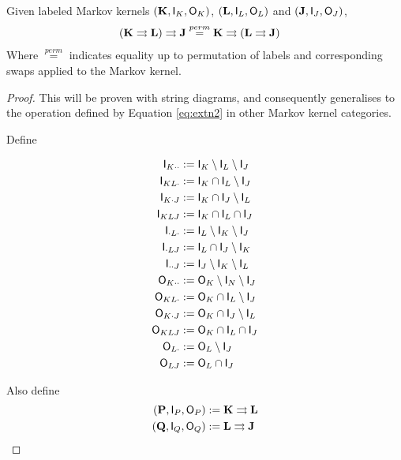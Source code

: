 \begin{lemma}
Given labeled Markov kernels $(\mathbf{K},\mathsf{I}_K,\mathsf{O}_K)$, $(\mathbf{L},\mathsf{I}_L,\mathsf{O}_L)$ and $(\mathbf{J},\mathsf{I}_J,\mathsf{O}_J)$,
\begin{align}
	(\mathbf{K}\rightrightarrows \mathbf{L})\rightrightarrows \mathbf{J} &\overset{perm}{=} \mathbf{K}\rightrightarrows (\mathbf{L}\rightrightarrows \mathbf{J})
\end{align}
Where $\overset{perm}{=}$ indicates equality up to permutation of labels and corresponding swaps applied to the Markov kernel.
\end{lemma}

\begin{proof}
This will be proven with string diagrams, and consequently generalises to the operation defined by Equation \ref{eq:extn2} in other Markov kernel categories.

Define

\begin{align}
	\mathsf{I}_{K\cdot\cdot}&:=\mathsf{I}_K\setminus\mathsf{I}_L\setminus\mathsf{I}_J\\
	\mathsf{I}_{KL\cdot}&:=\mathsf{I}_K\cap\mathsf{I}_L\setminus\mathsf{I}_J\\
	\mathsf{I}_{K\cdot J}&:=\mathsf{I}_K\cap\mathsf{I}_J\setminus\mathsf{I}_L\\
	\mathsf{I}_{KL J}&:=\mathsf{I}_K\cap \mathsf{I}_L\cap\mathsf{I}_J\\
	\mathsf{I}_{\cdot L \cdot} &:= \mathsf{I}_L\setminus\mathsf{I}_K\setminus \mathsf{I}_J\\
	\mathsf{I}_{\cdot L J} &:= \mathsf{I}_L\cap \mathsf{I}_J\setminus \mathsf{I}_K\\
	\mathsf{I}_{\cdot\cdot J} &:= \mathsf{I}_J\setminus\mathsf{I}_K\setminus\mathsf{I}_L\\
	\mathsf{O}_{K\cdot\cdot} &:= \mathsf{O}_K\setminus\mathsf{I}_N\setminus\mathsf{I}_J\\
	\mathsf{O}_{KL\cdot} &:= \mathsf{O}_K\cap\mathsf{I}_L\setminus\mathsf{I}_J\\
	\mathsf{O}_{K\cdot J} &:= \mathsf{O}_K\cap\mathsf{I}_J\setminus\mathsf{I}_L\\
	\mathsf{O}_{KLJ} &:= \mathsf{O}_K\cap\mathsf{I}_L\cap\mathsf{I}_J\\
	\mathsf{O}_{L\cdot} &:= \mathsf{O}_L\setminus\mathsf{I}_J\\
	\mathsf{O}_{LJ} &:= \mathsf{O}_L\cap\mathsf{I}_J
\end{align}

Also define
\begin{align}
	(\mathbf{P},\mathsf{I}_P,\mathsf{O}_P)&:=\mathbf{K}\rightrightarrows \mathbf{L}\\
	(\mathbf{Q},\mathsf{I}_Q,\mathsf{O}_Q)&:=\mathbf{L}\rightrightarrows \mathbf{J}
\end{align}


\end{proof}
